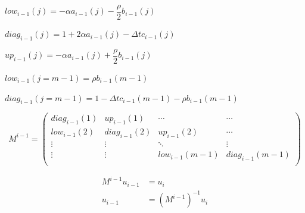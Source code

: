 \documentclass[titlepage]{article}
\begin{document}
\vspace{10pt}
$low_{i-1}(j) = -\alpha a_{i-1}(j) - \dfrac{\rho}{2} b_{i-1}(j)$

\vspace{10pt}
$diag_{i-1}(j) = 1 + 2 \alpha a_{i-1}(j) - \Delta t c_{i-1}(j)$

\vspace{10pt}
$up_{i-1}(j) =  -\alpha a_{i-1}(j) + \dfrac{\rho}{2} b_{i-1}(j)$

\vspace{10pt}
$low_{i-1}(j = m-1) =  \rho b_{i-1}(m-1)$

\vspace{10pt}
$diag_{i-1}(j = m-1) = 1 - \Delta t c_{i-1}(m-1) - \rho b_{i-1}(m-1)$

\vspace{10pt}
\begin{center}
$$ M^{i-1} = 
	\begin{pmatrix}
		diag_{i-1}(1) & up_{i-1}(1) & \cdots & \cdots \\
		low_{i-1}(2) & diag_{i-1}(2) & up_{i-1}(2) & \cdots \\
		\vdots  & \vdots  & \ddots & \vdots  \\
		\vdots  & \vdots  & low_{i-1}(m - 1) & diag_{i-1}(m - 1) \\ 
	\end{pmatrix}
$$
\end{center}

\begin{align*}
	M^{i-1}u_{i-1} &= u_{i} \\
	u_{i-1} &= (M^{i-1})^{-1} u_{i}
\end{align*}
\end{document}

